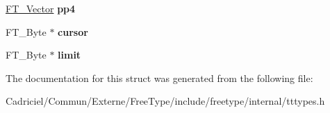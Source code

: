 \begin{DoxyCompactItemize}
\item 
\hyperlink{struct_f_t___vector__}{F\+T\+\_\+\+Vector} {\bfseries pp4}\hypertarget{struct_t_t___loader_rec___a0608203207c3fc735046b8baef4b9201}{}\label{struct_t_t___loader_rec___a0608203207c3fc735046b8baef4b9201}

\item 
F\+T\+\_\+\+Byte $\ast$ {\bfseries cursor}\hypertarget{struct_t_t___loader_rec___a6769a96f37ca22801f6199937cbe9ca7}{}\label{struct_t_t___loader_rec___a6769a96f37ca22801f6199937cbe9ca7}

\item 
F\+T\+\_\+\+Byte $\ast$ {\bfseries limit}\hypertarget{struct_t_t___loader_rec___a1b07761e8ea436c38b4c42117a00a0ff}{}\label{struct_t_t___loader_rec___a1b07761e8ea436c38b4c42117a00a0ff}

\end{DoxyCompactItemize}


The documentation for this struct was generated from the following file\+:\begin{DoxyCompactItemize}
\item 
Cadriciel/\+Commun/\+Externe/\+Free\+Type/include/freetype/internal/tttypes.\+h\end{DoxyCompactItemize}
